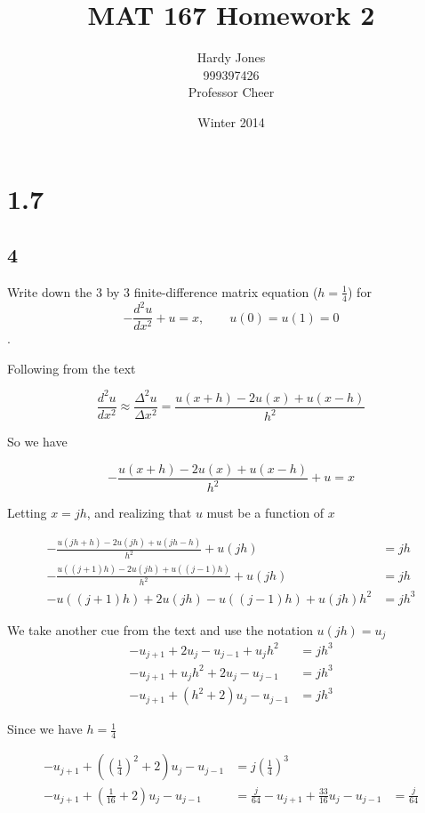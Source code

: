 \documentclass[12pt,letterpaper]{article}
\title{MAT 167 Homework 2\vspace{-2ex}}
\author{Hardy Jones\\
        999397426\\
        Professor Cheer\vspace{-2ex}}
\date{Winter 2014}
\begin{document}
  \maketitle

  \section*{1.7}
    \subsection*{4}
      Write down the 3 by 3 finite-difference matrix equation ($h = \frac{1}{4}$) for
      \[-\frac{d^2u}{dx^2} + u = x, \qquad u(0) = u(1) = 0\].

      Following from the text

      \[\frac{d^2u}{dx^2} \approx \frac{\Delta^2u}{\Delta x^2} = \frac{u(x+h) - 2u(x) + u(x-h)}{h^2}\]

      So we have

      \[-\frac{u(x+h) - 2u(x) + u(x-h)}{h^2} + u = x\]

      Letting $x = jh$, and realizing that $u$ must be a function of $x$

      \begin{align*}
        -\frac{u(jh+h) - 2u(jh) + u(jh-h)}{h^2} + u(jh) &= jh \\
        -\frac{u((j+1)h) - 2u(jh) + u((j-1)h)}{h^2} + u(jh) &= jh \\
        -u((j+1)h) + 2u(jh) - u((j-1)h) + u(jh)h^2 &= jh^3
      \end{align*}

      We take another cue from the text and use the notation $u(jh) = u_j$
      \begin{align*}
        -u_{j+1} + 2u_j - u_{j-1} + u_jh^2 &= jh^3 \\
        -u_{j+1} + u_jh^2 + 2u_j - u_{j-1} &= jh^3 \\
        -u_{j+1} + (h^2 + 2)u_j - u_{j-1} &= jh^3
      \end{align*}

      Since we have $h = \frac{1}{4}$

      \begin{align*}
        -u_{j+1} + ((\tfrac{1}{4})^2 + 2)u_j - u_{j-1} &= j(\tfrac{1}{4})^3 \\
        -u_{j+1} + (\tfrac{1}{16} + 2)u_j - u_{j-1} &= \tfrac{j}{64}
        -u_{j+1} + \tfrac{33}{16}u_j - u_{j-1} &= \tfrac{j}{64}
      \end{align*}
\end{document}
